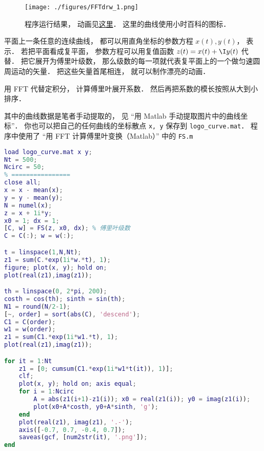 
\begin{issues}
\issueDraft
\end{issues}


\begin{figure}[ht]
\centering
\texttt{[image: ./figures/FFTdrw\_1.png]}
\caption{程序运行结果， 动画见\href{https://wuli.wiki/apps/FFTplt.html}{这里}． 这里的曲线使用小时百科的图标．} \label{FFTdrw_fig1}
\end{figure}

平面上一条任意的连续曲线， 都可以用直角坐标的参数方程 $x(t), y(t)$， 表示． 若把平面看成复平面， 参数方程可以用复值函数 $z(t) = x(t) + \I y(t)$ 代替． 把它展开为傅里叶级数， 那么级数的每一项就代表复平面上的一个做匀速圆周运动的矢量． 把这些矢量首尾相连， 就可以制作漂亮的动画．

用 FFT 代替定积分， 计算傅里叶展开系数． 然后再把系数的模长按照从大到小排序．

其中的曲线数据是笔者手动提取的， 见 “用 Matlab 手动提取图片中的曲线坐标”． 你也可以把自己的任何曲线的坐标散点 \verb|x, y| 保存到 \verb|logo_curve.mat|． 程序中使用了 “用 FFT 计算傅里叶变换（Matlab）” 中的 \verb|FS.m|

\begin{lstlisting}[language=matlab, caption=FFTplt.m]
% ==== 参数设置 ====
load logo_curve.mat x y;
Nt = 500;
Ncirc = 50;
% ================
close all;
x = x - mean(x);
y = y - mean(y);
N = numel(x);
z = x + 1i*y;
x0 = 1; dx = 1;
[C, w] = FS(z, x0, dx); % 傅里叶级数
C = C(:); w = w(:);

t = linspace(1,N,Nt);
z1 = sum(C.*exp(1i*w.*t), 1);
figure; plot(x, y); hold on;
plot(real(z1),imag(z1));

th = linspace(0, 2*pi, 200);
costh = cos(th); sinth = sin(th);
N1 = round(N/2-1);
[~, order] = sort(abs(C), 'descend');
C1 = C(order);
w1 = w(order);
z1 = sum(C1.*exp(1i*w1.*t), 1);
plot(real(z1),imag(z1));

for it = 1:Nt
    z1 = [0; cumsum(C1.*exp(1i*w1*t(it)), 1)];
    clf;
    plot(x, y); hold on; axis equal;
    for i = 1:Ncirc
        A = abs(z1(i+1)-z1(i)); x0 = real(z1(i)); y0 = imag(z1(i));
        plot(x0+A*costh, y0+A*sinth, 'g');
    end
    plot(real(z1), imag(z1), '.-');
    axis([-0.7, 0.7, -0.4, 0.7]);
    saveas(gcf, [num2str(it), '.png']);
end
\end{lstlisting}
